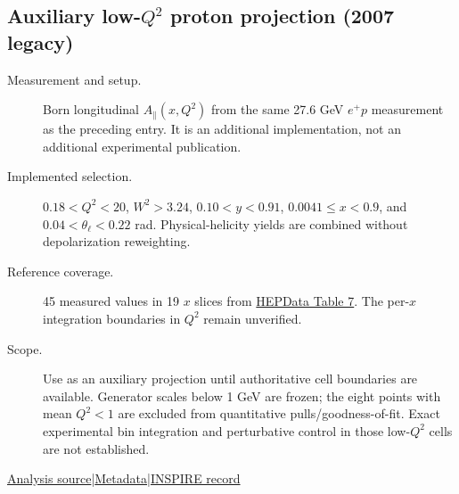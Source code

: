 \documentclass[11pt,a4paper]{article}
\newcommand{\id}[1]{{\small\texttt{\detokenize{#1}}}}
\begin{document}
\subsection{\texorpdfstring{Auxiliary low-$Q^2$ proton projection (2007 legacy)}{Auxiliary low-Q2 proton projection (2007 legacy)}}
\id{HERMES_2007_I726689_LEGACY}\quad\cite{r726689}
\begin{description}
\item[Measurement and setup.] Born longitudinal $A_\parallel(x,Q^2)$ from the same 27.6 GeV $e^+p$ measurement as the preceding entry. It is an additional implementation, not an additional experimental publication.
\item[Implemented selection.] $0.18<Q^2<20$, $W^2>3.24$, $0.10<y<0.91$, $0.0041\le x<0.9$, and $0.04<\theta_\ell<0.22$ rad. Physical-helicity yields are combined without depolarization reweighting.
\item[Reference coverage.] 45 measured values in 19 $x$ slices from \href{https://doi.org/10.17182/hepdata.11211.v1/t7}{HEPData Table 7}. The per-$x$ integration boundaries in $Q^2$ remain unverified.
\item[Scope.] Use as an auxiliary projection until authoritative cell boundaries are available. Generator scales below 1 GeV are frozen; the eight points with mean $Q^2<1$ are excluded from quantitative pulls/goodness-of-fit. Exact experimental bin integration and perturbative control in those low-$Q^2$ cells are not established.
\end{description}
{\small\href{https://github.com/apapaefs/HerwigPolarizedPheno/blob/105045bd757aaa6b217e87811dc5f9a22a8d1cef/analyses/rivet/dis/HERMES_2007_I726689_LEGACY.cc}{Analysis source}\quad|\quad\href{https://github.com/apapaefs/HerwigPolarizedPheno/blob/105045bd757aaa6b217e87811dc5f9a22a8d1cef/analyses/rivet/dis/HERMES_2007_I726689_LEGACY.info}{Metadata}\quad|\quad\href{https://inspirehep.net/literature/726689}{INSPIRE record}}

\clearpage
{}
\end{document}
